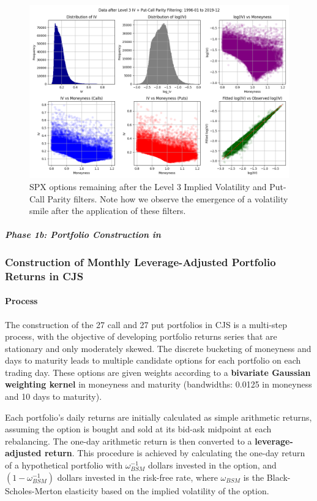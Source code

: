 \documentclass{article}
\begin{document}
\begin{appendices}
\begin{figure}[H]
  \centering
  \includegraphics[width=\linewidth,height=0.666\linewidth]{../docs_src/L3_IV_PCP_1996-01_2019-12_iv.png}
  \caption{SPX options remaining after the Level 3 Implied Volatility and Put-Call Parity filters. Note how we observe the emergence of a volatility smile after the application of these filters.}
  \label{fig:l3_iv_pcp_spx_options_data}
\end{figure}


\paragraph{\textit{Phase 1b: Portfolio Construction in \citet{Constantinides2013}}}
\subsubsection*{Construction of Monthly Leverage-Adjusted Portfolio Returns in CJS}

\paragraph{Process}
The construction of the 27 call and 27 put portfolios in CJS is a multi-step process, with the objective of developing portfolio returns series that are stationary and only moderately skewed. The discrete bucketing of moneyness and days to maturity leads to multiple candidate options for each portfolio on each trading day. These options are given weights according to a \textbf{bivariate Gaussian weighting kernel} in moneyness and maturity (bandwidths: 0.0125 in moneyness and 10 days to maturity).

Each portfolio's daily returns are initially calculated as simple arithmetic returns, assuming the option is bought and sold at its bid-ask midpoint at each rebalancing. The one-day arithmetic return is then converted to a \textbf{leverage-adjusted return}. This procedure is achieved by calculating the one-day return of a hypothetical portfolio with $\omega_{BSM}^{-1}$ dollars invested in the option, and $(1 - \omega_{BSM}^{-1})$ dollars invested in the risk-free rate, where $\omega_{BSM}$ is the Black-Scholes-Merton elasticity based on the implied volatility of the option.


\end{appendices}
\end{document}
